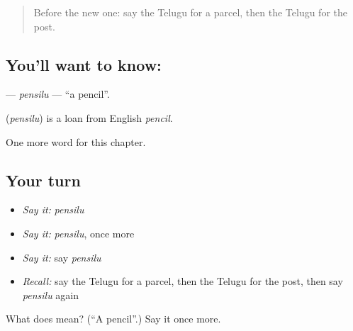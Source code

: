 \begin{quote}
Before the new one: say the Telugu for a parcel, then the Telugu for the post.
\end{quote}

\subsection*{You'll want to know: }
\textbf{} — \emph{pensilu} — \textquotedblleft{}a pencil\textquotedblright{}.

\begin{cousinweb}
\textbf{} (\emph{pensilu}) is a loan from English \emph{pencil}.
\end{cousinweb}

\begin{grammarlens}[title={What you've built}]
One more word for this chapter.
\end{grammarlens}

\subsection*{Your turn}
\begin{itemize}
\raggedright
  \item \emph{Say it:} \emph{pensilu}
  \item \emph{Say it:} \emph{pensilu}, once more
  \item \emph{Say it:} say \emph{pensilu}
  \item \emph{Recall:} say the Telugu for a parcel, then the Telugu for the post, then say \emph{pensilu} again
\end{itemize}

\begin{tcolorbox}[breakable,colback=teal!4,colframe=teal!35!black,title={Before you move on}]
What does  mean? (\textquotedblleft{}A pencil\textquotedblright{}.) Say it once more.
\end{tcolorbox}
